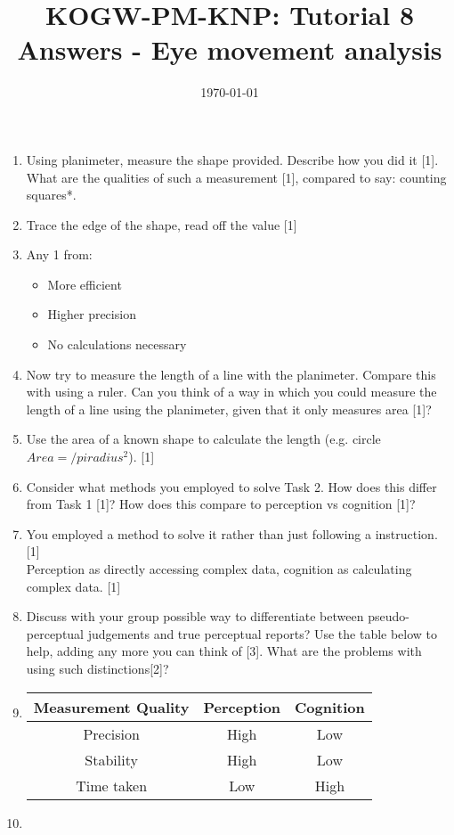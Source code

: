 \documentclass[12pt,english]{scrartcl}
\title{KOGW-PM-KNP: Tutorial 8 Answers - Eye movement analysis}
\author{}
\date{\today}
\begin{document}
\maketitle

\begin{enumerate}
 \item Using planimeter, measure the shape provided. Describe how you did it [1]. What are the qualities of such a measurement [1], compared to say: counting squares*.
 \item[]
 \color{blue}
 Trace the edge of the shape, read off the value [1] 
 \item[]
 Any 1 from:
 \begin{itemize}
 \item More efficient
 \item Higher precision
 \item No calculations necessary 
 \end{itemize} 
 
 \color{black}
 \item Now try to measure the length of a line with the planimeter. Compare this with using a ruler. Can you think of a way in which you could measure the length of a line using the planimeter, given that it only measures area [1]?
 \item[]
 \color{blue}
 Use the area of a known shape to calculate the length (e.g. circle $Area =/pi radius^2 $). [1]
 
 \color{black}
 \item Consider what methods you employed to solve Task 2. How does this differ from Task 1 [1]? How does this compare to perception vs cognition [1]?
 \item[]
 \color{blue}
 You employed a method to solve it rather than just following a instruction. [1] \\
 Perception as directly accessing complex data, cognition as calculating complex data. [1]
 
 \color{black}
 \item Discuss with your group possible way to differentiate between pseudo-perceptual judgements and true perceptual reports? Use the table below to help, adding any more you can think of [3]. What are the problems with using such distinctions[2]?
 \item[]

  \begin{center}
   \begin{tabular}{ || c c c || } 
   \hline
   Measurement Quality & Perception & Cognition \\ 
   \hline
   Precision & \color{blue} High & \color{blue} Low  \\ 
   \hline
   Stability & \color{blue} High & \color{blue} Low  \\ 
   \hline
   Time taken  & \color{blue} Low  & \color{blue} High \\
   \hline
   \end{tabular}
  \end{center}
  \item[]
  

\end{enumerate}
\end{document}
